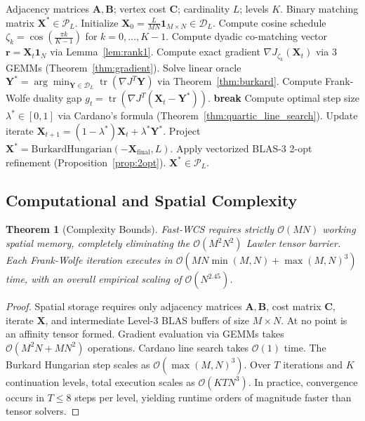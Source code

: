 \documentclass[a4paper,fleqn]{cas-dc}
\theoremstyle{thmstyleone}
\newtheorem{theorem}{Theorem}
\theoremstyle{thmstyletwo}
\theoremstyle{thmstylethree}
\begin{document}
\begin{algorithm}[!t]
\caption{Fast-WCS Analytical Optimization Framework}
\label{alg:fast_wcs}
\begin{algorithmic}[1]\small
\REQUIRE Adjacency matrices $\mathbf{A}, \mathbf{B}$; vertex cost $\mathbf{C}$; cardinality $L$; levels $K$.
\ENSURE Binary matching matrix $\mathbf{X}^* \in \mathcal{P}_L$.
\STATE Initialize $\mathbf{X}_0 = \frac{L}{M N} \mathbf{1}_{M \times N} \in \mathcal{D}_L$.
\STATE Compute cosine schedule $\zeta_k = \cos\left( \frac{\pi k}{K-1} \right)$ for $k = 0, \dots, K-1$.
    \REPEAT
        \STATE Compute dyadic co-matching vector $\mathbf{r} = \mathbf{X}_t \mathbf{1}_N$ via Lemma~\ref{lem:rank1}.
        \STATE Compute exact gradient $\nabla J_{\zeta_k}(\mathbf{X}_t)$ via 3 GEMMs (Theorem~\ref{thm:gradient}).
        \STATE Solve linear oracle $\mathbf{Y}^* = \arg\min_{\mathbf{Y} \in \mathcal{D}_L} \operatorname{tr}(\nabla J^T \mathbf{Y})$ via Theorem~\ref{thm:burkard}.
        \STATE Compute Frank-Wolfe duality gap $g_t = \operatorname{tr}(\nabla J^T(\mathbf{X}_t - \mathbf{Y}^*))$.
            \STATE \textbf{break}
        \ENDIF
        \STATE Compute optimal step size $\lambda^* \in [0, 1]$ via Cardano's formula (Theorem~\ref{thm:quartic_line_search}).
        \STATE Update iterate $\mathbf{X}_{t+1} = (1 - \lambda^*)\mathbf{X}_t + \lambda^*\mathbf{Y}^*$.
\ENDFOR
\STATE Project $\mathbf{X}^* = \text{BurkardHungarian}(-\mathbf{X}_{\text{final}}, L)$.
\STATE Apply vectorized BLAS-3 2-opt refinement (Proposition~\ref{prop:2opt}).
\RETURN $\mathbf{X}^* \in \mathcal{P}_L$.
\end{algorithmic}
\end{algorithm}

\subsection{Computational and Spatial Complexity}
\begin{theorem}[Complexity Bounds]
Fast-WCS requires strictly $\mathcal{O}(MN)$ working spatial memory, completely eliminating the $\mathcal{O}(M^2 N^2)$ Lawler tensor barrier. Each Frank-Wolfe iteration executes in $\mathcal{O}(MN\min(M, N) + \max(M, N)^3)$ time, with an overall empirical scaling of $\mathcal{O}(N^{2.45})$.
\end{theorem}
\begin{proof}
Spatial storage requires only adjacency matrices $\mathbf{A}, \mathbf{B}$, cost matrix $\mathbf{C}$, iterate $\mathbf{X}$, and intermediate Level-3 BLAS buffers of size $M \times N$. At no point is an affinity tensor formed. Gradient evaluation via GEMMs takes $\mathcal{O}(M^2 N + M N^2)$ operations. Cardano line search takes $\mathcal{O}(1)$ time. The Burkard Hungarian step scales as $\mathcal{O}(\max(M, N)^3)$. Over $T$ iterations and $K$ continuation levels, total execution scales as $\mathcal{O}(K T N^3)$. In practice, convergence occurs in $T \le 8$ steps per level, yielding runtime orders of magnitude faster than tensor solvers.
\end{proof}
\end{document}
